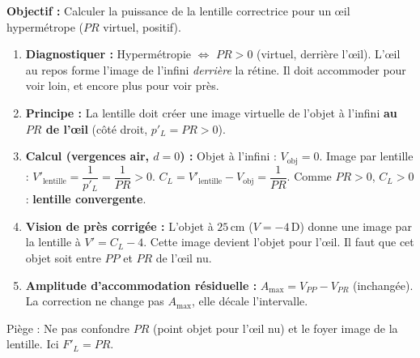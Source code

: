 \documentclass[11pt]{article}
\newcommand{\cle}[1]{{\popxbold\color{popdark}#1}}
\begin{document}
\begin{methode}
\textbf{Objectif :} Calculer la puissance de la lentille correctrice pour un œil hypermétrope ($PR$ virtuel, positif).
\begin{enumerate}
    \item \textbf{Diagnostiquer :} Hypermétropie $\Leftrightarrow$ $PR > 0$ (virtuel, derrière l'œil). L'œil au repos forme l'image de l'infini \emph{derrière} la rétine. Il doit accommoder pour voir loin, et encore plus pour voir près.
    \item \textbf{Principe :} La lentille doit créer une image virtuelle de l'objet à l'infini \textbf{au $PR$ de l'œil} (côté droit, $p'_{L} = PR > 0$).
    \item \textbf{Calcul (vergences air, $d=0$) :}
    Objet à l'infini : $V_{\text{obj}} = 0$.
    Image par lentille : $V'_{\text{lentille}} = \dfrac{1}{p'_{L}} = \dfrac{1}{PR} > 0$.
    $C_L = V'_{\text{lentille}} - V_{\text{obj}} = \dfrac{1}{PR}$.
    Comme $PR > 0$, $C_L > 0$ : \textbf{lentille convergente}.
    \item \textbf{Vision de près corrigée :} L'objet à $25\,\text{cm}$ ($V=-4\,\text{D}$) donne une image par la lentille à $V' = C_L - 4$. Cette image devient l'objet pour l'œil. Il faut que cet objet soit entre $PP$ et $PR$ de l'œil nu.
    \item \textbf{Amplitude d'accommodation résiduelle :} $A_{\text{max}} = V_{PP} - V_{PR}$ (inchangée). La correction ne change pas $A_{\text{max}}$, elle décale l'intervalle.
\end{enumerate}
\cle{Piège :} Ne pas confondre $PR$ (point objet pour l'œil nu) et le foyer image de la lentille. Ici $F'_L = PR$.
\end{methode}
\end{document}
